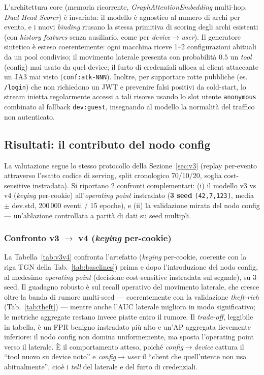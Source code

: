L'architettura core (memoria ricorrente, \textit{GraphAttentionEmbedding} multi-hop, \textit{Dual Head Scorer}) è invariata: il modello è agnostico al numero di archi per evento, e i nuovi \textit{binding} riusano la stessa primitiva di scoring degli archi esistenti (con \textit{history features} senza ausiliario, come per \textit{device}$\rightarrow$\textit{user}). Il generatore sintetico è esteso coerentemente: ogni macchina riceve 1--2 configurazioni abituali da un pool condiviso; il movimento laterale presenta con probabilità $0.5$ un \emph{tool} (config) mai usato da quel device; il furto di credenziali alloca al client attaccante un JA3 mai visto (\texttt{conf:atk-NNN}). Inoltre, per supportare rotte pubbliche (es. \texttt{/login}) che non richiedono un JWT e prevenire falsi positivi da cold-start, lo stream inietta regolarmente accessi a tali risorse usando lo slot utente \texttt{anonymous} combinato al fallback \texttt{dev:guest}, insegnando al modello la normalità del traffico non autenticato.

\subsection{Risultati: il contributo del nodo config}
\label{sec:v4results}

La valutazione segue lo stesso protocollo della Sezione~\ref{sec:v3} (replay per-evento attraverso l'esatto codice di serving, split cronologico 70/10/20, soglia cost-sensitive instradata). Si riportano 2 confronti complementari: (i) il modello v3 vs v4 (\textit{keying} per-cookie) all'\textit{operating point} instradato (\textbf{3 seed} \texttt{[42,7,123]}, media $\pm$ dev.std, 200\,000 eventi / 15 epoche), e (ii) la validazione mirata del nodo config — un'ablazione controllata a parità di dati su seed multipli.

\subsubsection{Confronto v3 $\rightarrow$ v4 (\textit{keying} per-cookie)}

La Tabella~\ref{tab:v3v4} confronta l'artefatto (\textit{keying} per-cookie, coerente con la riga TGN della Tab.~\ref{tab:baselines}) prima e dopo l'introduzione del nodo config, al medesimo \textit{operating point} (decisione cost-sensitive instradata sul segnale), su 3 seed. Il guadagno robusto è sul recall operativo del movimento laterale, che cresce oltre la banda di rumore multi-seed --- coerentemente con la validazione \textit{theft-rich} (Tab.~\ref{tab:theft}) --- mentre anche l'AUC laterale migliora in modo significativo; le metriche aggregate restano invece piatte entro il rumore. Il \textit{trade-off}, leggibile in tabella, è un FPR benigno instradato più alto e un'AP aggregata lievemente inferiore: il nodo config non domina uniformemente, ma sposta l'operating point verso il laterale. È il comportamento atteso, poiché \textit{config}$\rightarrow$\textit{device} cattura il ``tool nuovo su device noto'' e \textit{config}$\rightarrow$\textit{user} il ``client che quell'utente non usa abitualmente'', cioè i \textit{tell} del laterale e del furto di credenziali.


